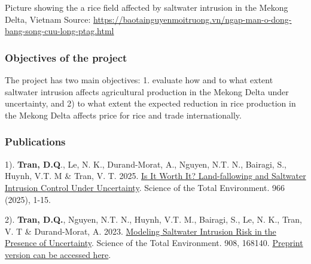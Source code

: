 \documentclass[
]{article}
\author{}
\date{\vspace{-2.5em}}
\begin{document}
\section{}\label{section}

\section{}\label{section-1}

Picture showing the a rice field affected by saltwater intrusion in the
Mekong Delta, Vietnam Source:
\url{https://baotainguyenmoitruong.vn/ngap-man-o-dong-bang-song-cuu-long-ptag.html}

\subsubsection{\texorpdfstring{\textbf{Objectives of the
project}}{Objectives of the project}}\label{objectives-of-the-project}

The project has two main objectives: 1. evaluate how and to what extent
saltwater intrusion affects agricultural production in the Mekong Delta
under uncertainty, and 2) to what extent the expected reduction in rice
production in the Mekong Delta affects price for rice and trade
internationally.

\subsubsection{\texorpdfstring{\textbf{Publications}}{Publications}}\label{publications}

1). \textbf{Tran, D.Q}., Le, N. K., Durand-Morat, A., Nguyen, N.T. N.,
Bairagi, S., Huynh, V.T. M \& Tran, V. T. 2025.
\href{https://authors.elsevier.com/a/1kYnzB8cd44R0}{Is It Worth It?
Land-fallowing and Saltwater Intrusion Control Under Uncertainty}.
Science of the Total Environment. 966 (2025), 1-15.

2). \textbf{Tran, D.Q.}, Nguyen, N.T. N., Huynh, V.T. M., Bairagi, S.,
Le, N. K., Tran, V. T \& Durand-Morat, A. 2023.
\href{https://doi.org/10.1016/j.scitotenv.2023.168140}{Modeling
Saltwater Intrusion Risk in the Presence of Uncertainty}. Science of the
Total Environment. 908, 168140.
\href{https://papers.ssrn.com/sol3/papers.cfm?abstract_id=4510877}{Preprint
version can be accessed here}.
\end{document}
